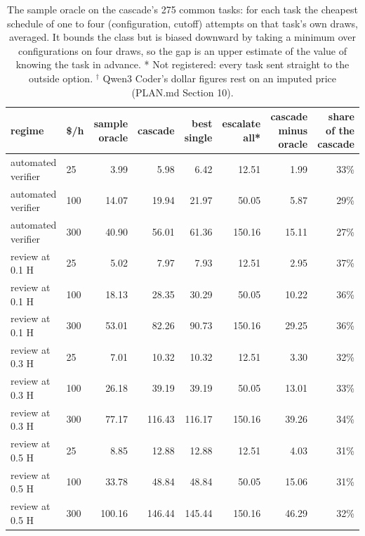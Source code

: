 \begin{table}[t]
\centering
\small
\caption{The sample oracle on the cascade's 275 common tasks: for each task the cheapest schedule of one to four (configuration, cutoff) attempts on that task's own draws, averaged. It bounds the class but is biased downward by taking a minimum over configurations on four draws, so the gap is an upper estimate of the value of knowing the task in advance. * Not registered: every task sent straight to the outside option. $^\dagger$ Qwen3 Coder's dollar figures rest on an imputed price (PLAN.md Section 10).}
\label{tab:tableA5_oracle}
\begin{tabular}{llrrrrrr}
\toprule
regime & \$/h & sample oracle & cascade & best single & escalate all* & cascade minus oracle & share of the cascade \\
\midrule
automated verifier & 25 & 3.99 & 5.98 & 6.42 & 12.51 & 1.99 & 33\% \\
automated verifier & 100 & 14.07 & 19.94 & 21.97 & 50.05 & 5.87 & 29\% \\
automated verifier & 300 & 40.90 & 56.01 & 61.36 & 150.16 & 15.11 & 27\% \\
\midrule
review at 0.1 H & 25 & 5.02 & 7.97 & 7.93 & 12.51 & 2.95 & 37\% \\
review at 0.1 H & 100 & 18.13 & 28.35 & 30.29 & 50.05 & 10.22 & 36\% \\
review at 0.1 H & 300 & 53.01 & 82.26 & 90.73 & 150.16 & 29.25 & 36\% \\
\midrule
review at 0.3 H & 25 & 7.01 & 10.32 & 10.32 & 12.51 & 3.30 & 32\% \\
review at 0.3 H & 100 & 26.18 & 39.19 & 39.19 & 50.05 & 13.01 & 33\% \\
review at 0.3 H & 300 & 77.17 & 116.43 & 116.17 & 150.16 & 39.26 & 34\% \\
\midrule
review at 0.5 H & 25 & 8.85 & 12.88 & 12.88 & 12.51 & 4.03 & 31\% \\
review at 0.5 H & 100 & 33.78 & 48.84 & 48.84 & 50.05 & 15.06 & 31\% \\
review at 0.5 H & 300 & 100.16 & 146.44 & 145.44 & 150.16 & 46.29 & 32\% \\
\bottomrule
\end{tabular}
\end{table}
